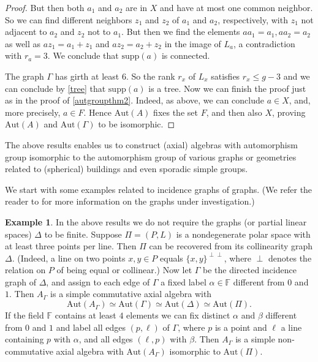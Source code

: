 \documentclass[oneside,a4paper]{amsart} %
\theoremstyle{definition}
\newtheorem{example}[proposition]{Example}
\begin{document}
\begin{proof}
But then both $a_1$ and $a_2$ are in $X$ and  have at most one common neighbor. So we can find different neighbors $z_1$ and $z_2$ of  $a_1$ and $a_2$, respectively,
with $z_1$ not adjacent to $a_2$ and $z_2$ not to $a_1$.
But then we find the elements $aa_1=a_1,aa_2=a_2$ as well as $az_1=a_1+z_1$ and $az_2=a_2+z_2$ in the image of  $L_a$, a contradiction with $r_a=3$.
We  conclude that $\mathrm{supp}(a)$ is connected. 



The graph $\Gamma$ has girth at least $6$. So the rank $r_x$ of $L_x$ satisfies $r_x\leq g-3$ and we can conclude by \cref{tree}
that $\mathrm{supp}(a)$ is a tree. Now we can finish the proof just as in the proof of \cref{autgroupthm2}.
Indeed, as above, we can conclude $a\in X$, and, more precisely, $a\in F$.
Hence $\mathrm{Aut}(A)$ fixes the set $F$, and  then also $X$, proving $\mathrm{Aut}(A)$  and $\mathrm{Aut}(\Gamma)$ to be isomorphic.
\end{proof}




The above results enables us to construct (axial) algebras with automorphism group isomorphic to the automorphism group of various graphs or  geometries
related to (spherical) buildings and even sporadic simple groups.

We start with some examples related to incidence graphs of graphs.
(We refer the reader to \cite{drg,BC} for more information on the graphs under investigation.)

\begin{example}
In the above results we do not require the graphs (or partial linear spaces) $\Delta$ to be finite.
Suppose $\Pi=(P,L)$ is a nondegenerate polar space with at least three points per line. 
Then $\Pi$ can be recovered from its collinearity graph $\Delta$. (Indeed, a line on two points $x,y\in P$ equals $\{x,y\}^{\perp\perp}$,
where $\perp$ denotes the relation on $P$ of being equal or collinear.)
Now let $\Gamma$ be the directed incidence graph of $\Delta$, and assign to each edge of $\Gamma$ a fixed label $\alpha\in \mathbb{F}$ different from $0$ and $1$. 
Then $A_\Gamma$ is a simple commutative axial algebra with $$\mathrm{Aut}(A_\Gamma)\simeq\mathrm{Aut}(\Gamma)\simeq\mathrm{Aut}(\Delta)\simeq \mathrm{Aut}(\Pi).$$
If the field $\mathbb{F}$ contains at least $4$ elements we can fix distinct $\alpha$ and $\beta$ different from $0$ and $1$
and label all edges $(p,\ell)$ of $\Gamma$, where $p$ is a point and $\ell$ a line containing $p$ with $\alpha$, and all edges $(\ell,p)$ with $\beta$.
Then $A_\Gamma$ is a simple non-commutative axial algebra with $\mathrm{Aut}(A_\Gamma)$ isomorphic to $\mathrm{Aut}(\Pi)$. 
\end{example}
\end{document}
